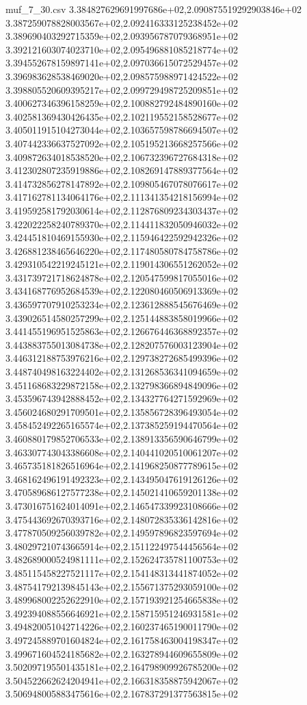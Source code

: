 \begin{filecontents*}{muf_7_30.csv}
3.384827629691997686e+02,2.090875519292903846e+02
3.387259078828003567e+02,2.092416333125238452e+02
3.389690403292715359e+02,2.093956787079368951e+02
3.392121603074023710e+02,2.095496881085218774e+02
3.394552678159897141e+02,2.097036615072529457e+02
3.396983628538469020e+02,2.098575988971424522e+02
3.398805520609395217e+02,2.099729498725209851e+02
3.400627346396158259e+02,2.100882792484890160e+02
3.402581369430426435e+02,2.102119552158528677e+02
3.405011915104273044e+02,2.103657598786694507e+02
3.407442336637527092e+02,2.105195213668257566e+02
3.409872634018538520e+02,2.106732396727684318e+02
3.412302807235919886e+02,2.108269147889377564e+02
3.414732856278147892e+02,2.109805467078076617e+02
3.417162781134064176e+02,2.111341354218156994e+02
3.419592581792030614e+02,2.112876809234303437e+02
3.422022258240789370e+02,2.114411832050946032e+02
3.424451810469155930e+02,2.115946422592942326e+02
3.426881238465646220e+02,2.117480580784758786e+02
3.429310542219245121e+02,2.119014306551262052e+02
3.431739721718624878e+02,2.120547599817055016e+02
3.434168776952684539e+02,2.122080460506913369e+02
3.436597707910253234e+02,2.123612888545676469e+02
3.439026514580257299e+02,2.125144883858019966e+02
3.441455196951525863e+02,2.126676446368892357e+02
3.443883755013084738e+02,2.128207576003123904e+02
3.446312188753976216e+02,2.129738272685499396e+02
3.448740498163224402e+02,2.131268536341094659e+02
3.451168683229872158e+02,2.132798366894849096e+02
3.453596743942888452e+02,2.134327764271592969e+02
3.456024680291709501e+02,2.135856728396493054e+02
3.458452492265165574e+02,2.137385259194470564e+02
3.460880179852706533e+02,2.138913356590646799e+02
3.463307743043386608e+02,2.140441020510061207e+02
3.465735181826516964e+02,2.141968250877789615e+02
3.468162496191492323e+02,2.143495047619126126e+02
3.470589686127577238e+02,2.145021410659201138e+02
3.473016751624014091e+02,2.146547339923108666e+02
3.475443692670393716e+02,2.148072835336142816e+02
3.477870509256039782e+02,2.149597896823597694e+02
3.480297210743665914e+02,2.151122497544456564e+02
3.482689000524981111e+02,2.152624735781100753e+02
3.485115458227521117e+02,2.154148313441874052e+02
3.487541792139845143e+02,2.155671375293059100e+02
3.489968002252622910e+02,2.157193921254665838e+02
3.492394088556646921e+02,2.158715951246931581e+02
3.494820051042714226e+02,2.160237465190011790e+02
3.497245889701604824e+02,2.161758463004198347e+02
3.499671604524185682e+02,2.163278944609655809e+02
3.502097195501435181e+02,2.164798909926785200e+02
3.504522662624204941e+02,2.166318358875942067e+02
3.506948005883475616e+02,2.167837291377563815e+02

\end{filecontents*}

